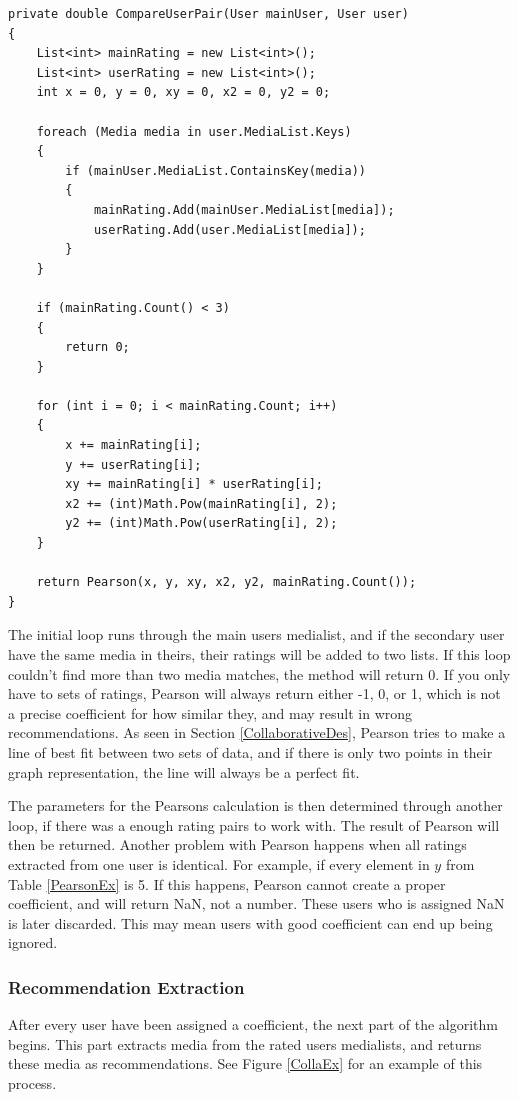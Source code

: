 \begin{lstlisting}[caption={The CompareUserPair method},label={CompareUserPairTwo}]
private double CompareUserPair(User mainUser, User user)
{
	List<int> mainRating = new List<int>();
	List<int> userRating = new List<int>();
	int x = 0, y = 0, xy = 0, x2 = 0, y2 = 0;

	foreach (Media media in user.MediaList.Keys)
	{
		if (mainUser.MediaList.ContainsKey(media))
		{
			mainRating.Add(mainUser.MediaList[media]);
			userRating.Add(user.MediaList[media]);
		}
	}

	if (mainRating.Count() < 3)
	{
		return 0;
	}

	for (int i = 0; i < mainRating.Count; i++)
	{
		x += mainRating[i];
		y += userRating[i];
		xy += mainRating[i] * userRating[i];
		x2 += (int)Math.Pow(mainRating[i], 2);
		y2 += (int)Math.Pow(userRating[i], 2);
	}

	return Pearson(x, y, xy, x2, y2, mainRating.Count());
}
\end{lstlisting}

The initial loop runs through the main users medialist, and if the secondary user have the same media in theirs, their ratings will be added to two lists. If this loop couldn’t find more than two media matches, the method will return 0. If you only have to sets of ratings, Pearson will always return either -1, 0, or 1, which is not a precise coefficient for how similar they, and may result in wrong recommendations. As seen in Section \ref{CollaborativeDes}, Pearson tries to make a line of best fit between two sets of data, and if there is only two points in their graph representation, the line will always be a perfect fit. 


The parameters for the Pearsons calculation is then determined through another loop, if there was a enough rating pairs to work with. The result of Pearson will then be returned. Another problem with Pearson happens when all ratings extracted from one user is identical. For example, if every element in $y$ from Table \ref{PearsonEx} is 5. If this happens, Pearson cannot create a proper coefficient, and will return NaN, not a number. These users who is assigned NaN is later discarded. This may mean users with good coefficient can end up being ignored.

\subsubsection{Recommendation Extraction}

After every user have been assigned a coefficient, the next part of the algorithm begins. This part extracts media from the rated users medialists, and returns these media as recommendations. See Figure \ref{CollaEx} for an example of this process.

